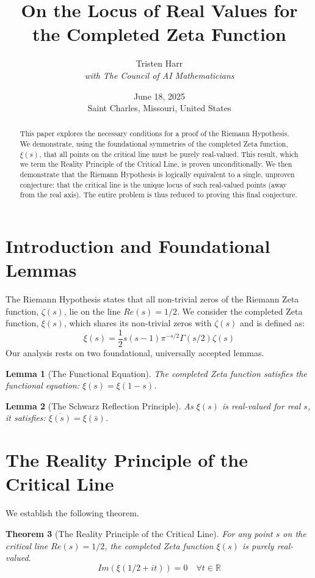 \documentclass{article}
\title{\textbf{On the Locus of Real Values for the Completed Zeta Function}}
\author{Tristen Harr \\ \textit{with The Council of AI Mathematicians}}
\date{June 18, 2025 \\ Saint Charles, Missouri, United States}
\newtheorem{theorem}{Theorem}[section]
\newtheorem{lemma}[theorem]{Lemma}
\begin{document}
\maketitle

\begin{abstract}
    This paper explores the necessary conditions for a proof of the Riemann Hypothesis. We demonstrate, using the foundational symmetries of the completed Zeta function, $\xi(s)$, that all points on the critical line must be purely real-valued. This result, which we term the Reality Principle of the Critical Line, is proven unconditionally. We then demonstrate that the Riemann Hypothesis is logically equivalent to a single, unproven conjecture: that the critical line is the unique locus of such real-valued points (away from the real axis). The entire problem is thus reduced to proving this final conjecture.
\end{abstract}

\section{Introduction and Foundational Lemmas}
The Riemann Hypothesis states that all non-trivial zeros of the Riemann Zeta function, $\zeta(s)$, lie on the line $Re(s)=1/2$. We consider the completed Zeta function, $\xi(s)$, which shares its non-trivial zeros with $\zeta(s)$ and is defined as:
$$\xi(s) = \frac{1}{2}s(s-1)\pi^{-s/2} \Gamma(s/2) \zeta(s)$$
Our analysis rests on two foundational, universally accepted lemmas.

\begin{lemma}[The Functional Equation]
The completed Zeta function satisfies the functional equation: $\xi(s) = \xi(1-s)$.
\end{lemma}

\begin{lemma}[The Schwarz Reflection Principle]
As $\xi(s)$ is real-valued for real $s$, it satisfies: $\overline{\xi(s)} = \xi(\bar{s})$.
\end{lemma}

\section{The Reality Principle of the Critical Line}
We establish the following theorem.

\begin{theorem}[The Reality Principle of the Critical Line]
For any point $s$ on the critical line $Re(s)=1/2$, the completed Zeta function $\xi(s)$ is purely real-valued.
$$Im(\xi(1/2 + it)) = 0 \quad \forall t \in \mathbb{R}$$
\end{theorem}
\end{document}
